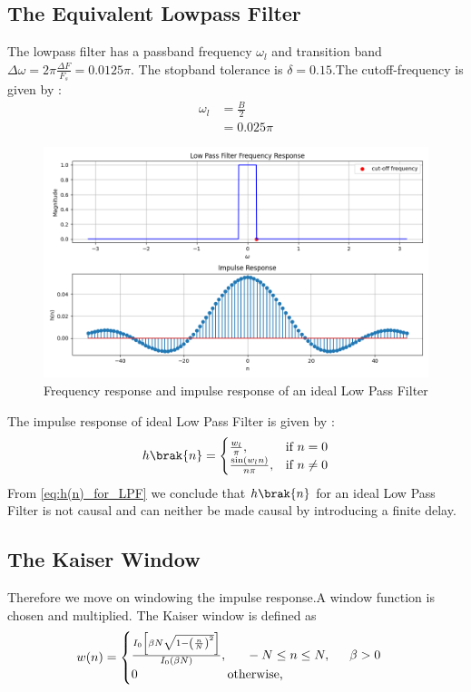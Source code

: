 \documentclass{article}
\begin{document}
\subsection{The Equivalent Lowpass Filter}
The lowpass filter has a passband frequency $\omega_l$ and transition band $\Delta \omega = 2\pi \frac{\Delta F}{F_s} = 0.0125\pi$.
The stopband tolerance is $\delta=0.15$.The cutoff-frequency is given by :
\begin{align}
    \omega_{l} &= \frac{B}{2}\\
                &= 0.025\pi
\end{align}
\begin{figure}[H]
\centering
\includegraphics[width=1\columnwidth]{figs/LPF_FIR.png}
\caption{Frequency response and impulse response of an ideal Low Pass Filter}
\label{fig:LPF_FIR_1}
\end{figure}

The impulse response of ideal Low Pass Filter is given by :
\begin{align}
    h\brak{n} = 
\begin{cases} 
    \frac{w_l}{\pi}, & \text{if } n = 0 \\
    \frac{\sin(w_l n)}{n\pi}, & \text{if } n \neq 0
\end{cases} \label{eq:h(n)_for_LPF}
\end{align}
From \eqref{eq:h(n)_for_LPF} we conclude that $h\brak{n}$ for an ideal Low Pass Filter is not causal and can neither be made causal by introducing a finite delay. 
\subsection{The Kaiser Window}
Therefore we move on windowing the impulse response.A window function is chosen and multiplied. The Kaiser window is defined as
\begin{align}
    w(n) =
    \begin{cases}
    \frac{I_0\left[ \beta N \sqrt{1 - \left(\frac{n}{N}\right)^2} \right]}{I_0(\beta N)},
\indent -N \leq n \leq N, \indent \beta > 0 \nonumber \\
 0 \hspace{2.5 cm} \mbox{otherwise,}
 \end{cases}
\end{align}
\end{document}
